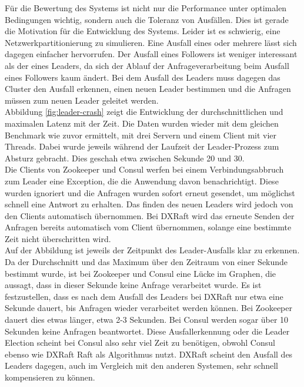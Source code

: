 Für die Bewertung des Systems ist nicht nur die Performance unter optimalen Bedingungen wichtig, sondern auch die Toleranz von Ausfällen. Dies ist gerade die Motivation für die Entwicklung des Systems. Leider ist es schwierig, eine Netzwerkpartitionierung zu simulieren. Eine Ausfall eines oder mehrere lässt sich dagegen einfacher hervorrufen. Der Ausfall eines Followers ist weniger interessant als der eines Leaders, da sich der Ablauf der Anfrageverarbeitung beim Ausfall eines Followers kaum ändert. Bei dem Ausfall des Leaders muss dagegen das Cluster den Ausfall erkennen, einen neuen Leader bestimmen und die Anfragen müssen zum neuen Leader geleitet werden. \\
Abbildung \ref{fig:leader-crash} zeigt die Entwicklung der durchschnittlichen und maximalen Latenz mit der Zeit. Die Daten wurden wieder mit dem gleichen Benchmark wie zuvor ermittelt, mit drei Servern und einem Client mit vier Threads. Dabei wurde jeweils während der Laufzeit der Leader-Prozess zum Absturz gebracht. Dies geschah etwa zwischen Sekunde 20 und 30. \\
Die Clients von Zookeeper und Consul werfen bei einem Verbindungsabbruch zum Leader eine Exception, die die Anwendung davon benachrichtigt. Diese wurden ignoriert und die Anfragen wurden sofort erneut gesendet, um möglichst schnell eine Antwort zu erhalten. Das finden des neuen Leaders wird jedoch von den Clients automatisch übernommen. Bei DXRaft wird das erneute Senden der Anfragen bereits automatisch vom Client übernommen, solange eine bestimmte Zeit nicht überschritten wird. \\
Auf der Abbildung ist jeweils der Zeitpunkt des Leader-Ausfalls klar zu erkennen. Da der Durchschnitt und das Maximum über den Zeitraum von einer Sekunde bestimmt wurde, ist bei Zookeeper und Consul eine Lücke im Graphen, die aussagt, dass in dieser Sekunde keine Anfrage verarbeitet wurde. Es ist festzustellen, dass es nach dem Ausfall des Leaders bei DXRaft nur etwa eine Sekunde dauert, bis Anfragen wieder verarbeitet werden können. Bei Zookeeper dauert dies etwas länger, etwa 2-3 Sekunden. Bei Consul werden sogar über 10 Sekunden keine Anfragen beantwortet. Diese Ausfallerkennung oder die Leader Election scheint bei Consul also sehr viel Zeit zu benötigen, obwohl Consul ebenso wie DXRaft Raft als Algorithmus nutzt. DXRaft scheint den Ausfall des Leaders dagegen, auch im Vergleich mit den anderen Systemen, sehr schnell kompensieren zu können.

